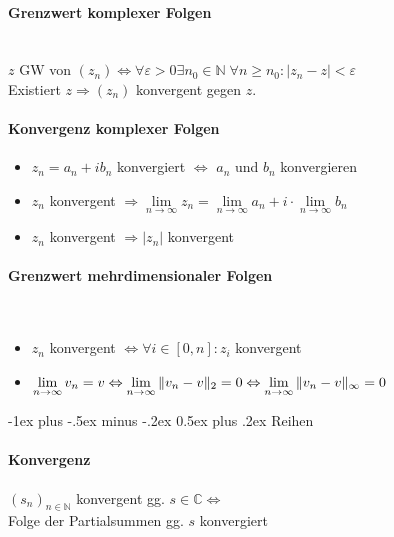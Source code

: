 \documentclass[paper=a3,paper=landscape, fontsize=9pt, DIV=30]{scrartcl}
\makeatletter
\newcommand{\compl}{\mathbb{C}}
\newcommand{\nat}{\mathbb{N}}
\newcommand{\srow}{(s_n)_{n \in \nat}}
\renewcommand{\section}{\@startsection{section}{1}{0mm}%
  {-1ex plus -.5ex minus -.2ex}%
  {0.5ex plus .2ex}%
  {\color{blue}\normalfont\large\bfseries}}
\makeatother
\begin{document}
\begin{multicols*}{4}
\paragraph{Grenzwert komplexer Folgen}\hspace{0pt} \\
$z$ GW von $(z_n) \Leftrightarrow \forall \varepsilon > 0 \exists n_0 \in \nat \; \forall n \geq n_0: |z_n - z| < \varepsilon$\\Existiert $z \Rightarrow (z_n)$ konvergent gegen $z$.


\paragraph{Konvergenz komplexer Folgen}
\begin{itemize}
	\item $z_n = a_n + ib_n$ konvergiert $\Leftrightarrow$ $a_n$ und $b_n$ konvergieren
	\item $z_n$ konvergent $\Rightarrow \lim\limits_{n \rightarrow \infty} z_n = \lim\limits_{n \rightarrow \infty} a_n + i \cdot \lim\limits_{n \rightarrow \infty} b_n$
	\item $z_n$ konvergent $\Rightarrow \lvert z_n \rvert$ konvergent
\end{itemize}


\paragraph{Grenzwert mehrdimensionaler Folgen}\hspace{0pt} \\
\begin{itemize}
	\item $z_n$ konvergent $\Leftrightarrow \forall i \in [0, n] : z_i$ konvergent
	\item $\lim\limits_{n \rightarrow \infty} v_n = v \Leftrightarrow \lim\limits_{n \rightarrow \infty} \Arrowvert v_n - v\Arrowvert_2 = 0 \Leftrightarrow \lim\limits_{n \rightarrow \infty} \Arrowvert v_n - v\Arrowvert_\infty = 0 $
\end{itemize}


  \section{Reihen}

  \paragraph{Konvergenz}
  $\srow$ konvergent gg. $s \in \compl \Leftrightarrow$\\Folge der Partialsummen gg. $s$ konvergiert


\end{multicols*}
\end{document}
